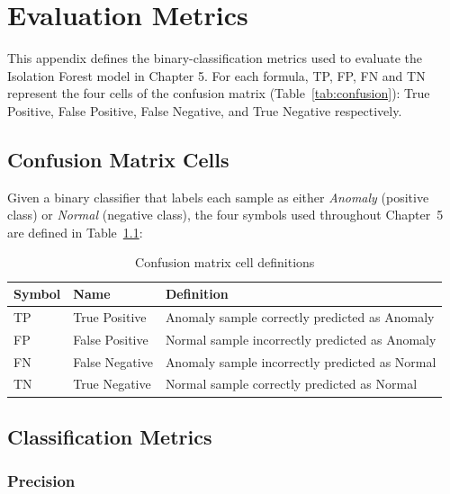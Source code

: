\chapter{Evaluation Metrics}
\label{app:ml_metrics}

This appendix defines the binary-classification metrics used to evaluate the Isolation Forest model in Chapter 5. For each formula, TP, FP, FN and TN represent the four cells of the confusion matrix (Table~\ref{tab:confusion}): True Positive, False Positive, False
Negative, and True Negative respectively.

\section{Confusion Matrix Cells}

Given a binary classifier that labels each sample as either
\textit{Anomaly} (positive class) or \textit{Normal} (negative class),
the four symbols used throughout Chapter~5 are defined in
Table~\ref{tab:cm_defs}:

\begin{table}[H]
\centering
\caption{Confusion matrix cell definitions}
\label{tab:cm_defs}
\small
\begin{tabular}{llp{8.5cm}}
\toprule
\textbf{Symbol} & \textbf{Name} & \textbf{Definition} \\
\midrule
TP & True Positive  & Anomaly sample correctly predicted as Anomaly \\
FP & False Positive & Normal sample incorrectly predicted as Anomaly \\
FN & False Negative & Anomaly sample incorrectly predicted as Normal \\
TN & True Negative  & Normal sample correctly predicted as Normal \\
\bottomrule
\end{tabular}
\end{table}

\section{Classification Metrics}

\subsection*{Precision}


